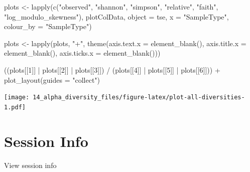 \documentclass[
]{book}
\newenvironment{Shaded}{\begin{snugshade}}{\end{snugshade}}
\newcommand{\AttributeTok}[1]{\textcolor[rgb]{0.77,0.63,0.00}{#1}}
\newcommand{\DecValTok}[1]{\textcolor[rgb]{0.00,0.00,0.81}{#1}}
\newcommand{\FunctionTok}[1]{\textcolor[rgb]{0.00,0.00,0.00}{#1}}
\newcommand{\NormalTok}[1]{#1}
\newcommand{\OtherTok}[1]{\textcolor[rgb]{0.56,0.35,0.01}{#1}}
\newcommand{\SpecialCharTok}[1]{\textcolor[rgb]{0.00,0.00,0.00}{#1}}
\newcommand{\StringTok}[1]{\textcolor[rgb]{0.31,0.60,0.02}{#1}}
\begin{document}
\begin{Shaded}
\begin{Highlighting}[]
\NormalTok{plots }\OtherTok{\textless{}{-}} \FunctionTok{lapply}\NormalTok{(}\FunctionTok{c}\NormalTok{(}\StringTok{"observed"}\NormalTok{, }\StringTok{"shannon"}\NormalTok{, }\StringTok{"simpson"}\NormalTok{, }\StringTok{"relative"}\NormalTok{, }\StringTok{"faith"}\NormalTok{, }\StringTok{"log\_modulo\_skewness"}\NormalTok{),}
\NormalTok{                plotColData,}
                \AttributeTok{object =}\NormalTok{ tse,}
                \AttributeTok{x =} \StringTok{"SampleType"}\NormalTok{,}
                \AttributeTok{colour\_by =} \StringTok{"SampleType"}\NormalTok{)}

\NormalTok{plots }\OtherTok{\textless{}{-}} \FunctionTok{lapply}\NormalTok{(plots, }\StringTok{"+"}\NormalTok{, }
                \FunctionTok{theme}\NormalTok{(}\AttributeTok{axis.text.x =} \FunctionTok{element\_blank}\NormalTok{(),}
                      \AttributeTok{axis.title.x =} \FunctionTok{element\_blank}\NormalTok{(),}
                      \AttributeTok{axis.ticks.x =} \FunctionTok{element\_blank}\NormalTok{()))}

\NormalTok{((plots[[}\DecValTok{1}\NormalTok{]] }\SpecialCharTok{|}\NormalTok{ plots[[}\DecValTok{2}\NormalTok{]] }\SpecialCharTok{|}\NormalTok{ plots[[}\DecValTok{3}\NormalTok{]]) }\SpecialCharTok{/} 
\NormalTok{(plots[[}\DecValTok{4}\NormalTok{]] }\SpecialCharTok{|}\NormalTok{ plots[[}\DecValTok{5}\NormalTok{]] }\SpecialCharTok{|}\NormalTok{ plots[[}\DecValTok{6}\NormalTok{]])) }\SpecialCharTok{+}
  \FunctionTok{plot\_layout}\NormalTok{(}\AttributeTok{guides =} \StringTok{"collect"}\NormalTok{)}
\end{Highlighting}
\end{Shaded}

\texttt{[image: 14\_alpha\_diversity\_files/figure-latex/plot-all-diversities-1.pdf]}

\hypertarget{session-info-4}{%
\section*{Session Info}\label{session-info-4}}

View session info
\end{document}
